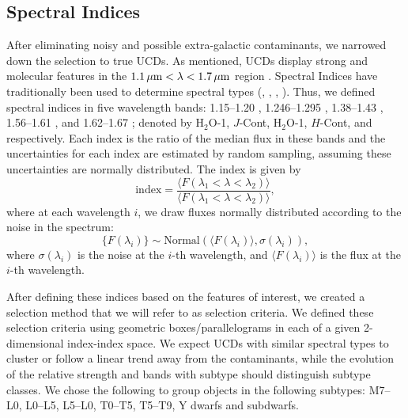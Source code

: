 \documentclass[manuscript]{aastex63}
\begin{document}
\subsection{Spectral Indices}
After eliminating noisy and possible extra-galactic contaminants, we narrowed down the selection to true UCDs. As mentioned, UCDs display strong \meth and \wat molecular features in the $1.1\, \mbox{$\mu$m} < \lambda < 1.7\, \mbox{$\mu$m}$ region \citep{2001PhDT.......116B}. Spectral Indices have traditionally been used to determine spectral types (\citealt{1999AJ....117.1010T}, \citealt{2000AJ....119.3019C}, \citealt{2007ApJ...657..511A}, \citealt{2007ApJ...658..557B}). Thus, we defined  spectral indices in five wavelength bands: 1.15--1.20 \micron, 1.246--1.295 \micron, 1.38--1.43 \micron,  1.56--1.61 \micron, and 1.62--1.67 \micron; denoted by H$_2$O-1, $J$-Cont, H$_2$O-1, $H$-Cont, and \meth respectively. Each index is the ratio of the median flux in these bands and the uncertainties for each index are estimated by random sampling, assuming these uncertainties are normally distributed. The index is
 given by 
 \begin{equation} \mathrm{index}=\frac{ \langle  F(\lambda_1<\lambda < \lambda_2) \rangle }{  \langle F(\lambda_1 < \lambda <\lambda_2) \rangle },
 \end{equation}
 where at each wavelength $i$, we draw fluxes normally distributed according to the noise in the spectrum: 
 \begin{equation} 
 \{F(\lambda _i)\} \sim \text{Normal} (\langle F(\lambda_i)\rangle, \sigma(\lambda_i )), \end{equation}
 where $\sigma(\lambda_i )$ is the noise at the $i$-th wavelength, and $\langle F(\lambda_i )\rangle$ is the flux at the $i$-th wavelength.

After defining these indices based on the features of interest, we created a selection method that we will refer to as selection criteria. We defined these selection criteria using geometric boxes/parallelograms in each of a given 2-dimensional index-index space. We expect UCDs with similar spectral types to cluster or follow a linear trend away from the contaminants, while the evolution of the relative strength \wat and \meth bands with subtype should distinguish subtype classes. We chose the following to group objects in the following subtypes: M7--L0, L0--L5, L5--L0, T0--T5, T5--T9, Y dwarfs and subdwarfs. 
\end{document}
